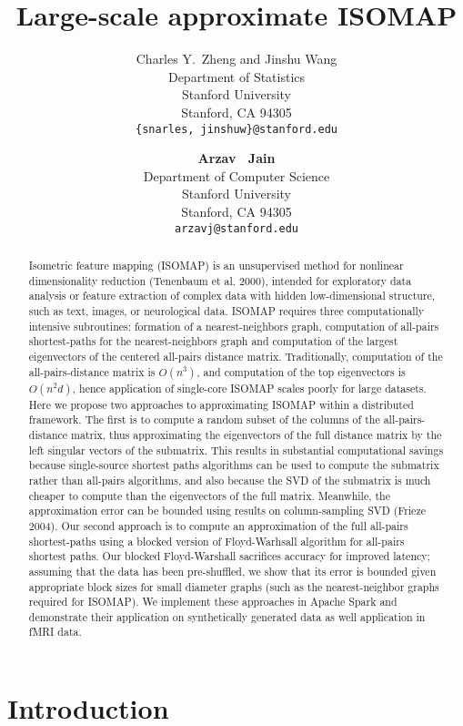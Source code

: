 \documentclass{article} %
\title{Large-scale approximate ISOMAP}
\author{
Charles Y.~Zheng and Jinshu Wang\\
Department of Statistics\\
Stanford University\\
Stanford, CA 94305 \\
\texttt{\{snarles, jinshuw\}@stanford.edu} \\
\and
\textbf{Arzav ~Jain} \\
Department of Computer Science\\
Stanford University\\
Stanford, CA 94305 \\
\texttt{arzavj@stanford.edu} \\
}
\begin{document}
\maketitle

\begin{abstract}
  Isometric feature mapping (ISOMAP) is an unsupervised method for
  nonlinear dimensionality reduction (Tenenbaum et al. 2000), intended
  for exploratory data analysis or feature extraction of complex data
  with hidden low-dimensional structure, such as text, images, or
  neurological data.  ISOMAP requires three computationally intensive
  subroutines: formation of a nearest-neighbors graph, computation of
  all-pairs shortest-paths for the nearest-neighbors graph and
  computation of the largest eigenvectors of the centered all-pairs
  distance matrix.  Traditionally, computation of the
  all-pairs-distance matrix is $O(n^3)$, and computation of the top
  eigenvectors is $O(n^2d)$, hence application of single-core ISOMAP
  scales poorly for large datasets.  Here we propose two approaches to
  approximating ISOMAP within a distributed framework.  The first is
  to compute a random subset of the columns of the all-pairs-distance
  matrix, thus approximating the eigenvectors of the full distance
  matrix by the left singular vectors of the submatrix.  This results
  in substantial computational savings because single-source shortest
  paths algorithms can be used to compute the submatrix rather than
  all-pairs algorithms, and also because the SVD of the submatrix is
  much cheaper to compute than the eigenvectors of the full matrix.
  Meanwhile, the approximation error can be bounded using results on
  column-sampling SVD (Frieze 2004).  Our second approach is to
  compute an approximation of the full all-pairs shortest-paths using
  a blocked version of Floyd-Warhsall algorithm for all-pairs shortest
  paths.  Our blocked Floyd-Warshall sacrifices accuracy for improved
  latency; assuming that the data has been pre-shuffled, we show that
  its error is bounded given appropriate block sizes for small
  diameter graphs (such as the nearest-neighbor graphs required for
  ISOMAP).  We implement these approaches in Apache Spark and
  demonstrate their application on synthetically generated data
  as well application in fMRI data.
\end{abstract}

\section{Introduction}
\end{document}
